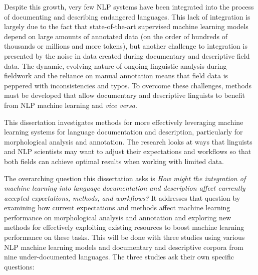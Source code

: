 Despite this growth, very few NLP systems have been integrated into the process of documenting and describing endangered languages. This lack of integration is largely due to the fact that state-of-the-art supervised machine learning models depend on large amounts of annotated data (on the order of hundreds of thousands or millions and more tokens), but another challenge to integration is presented by the noise in data created during documentary and descriptive field data. The dynamic, evolving nature of ongoing linguistic analysis during fieldwork and the reliance on manual annotation means that field data is peppered with inconsistencies and typos. To overcome these challenges, methods must be developed that allow documentary and descriptive linguists to benefit from NLP machine learning and \textit{vice versa}.

This dissertation investigates methods for more effectively leveraging machine learning systems for language documentation and description, particularly for morphological analysis and annotation. The research looks at ways that linguists and NLP scientists may want to adjust their expectations and workflows so that both fields can achieve optimal results when working with limited data. 


The overarching question this dissertation asks is \emph{How might the integration of machine learning into language documentation and description affect currently accepted expectations, methods, and workflows?} It addresses that question by examining how current expectations and methods affect machine learning performance on morphological analysis and annotation and exploring new methods for effectively exploiting existing resources to boost machine learning performance on these tasks. This will be done with three studies using various NLP machine learning models and documentary and descriptive corpora from nine under-documented languages. The three studies ask their own specific questions:

